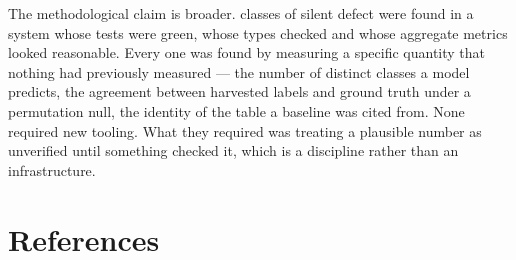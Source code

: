 \documentclass[11pt,a4paper]{article}
\begin{document}
The methodological claim is broader. \ndefectclasses{} classes of silent defect were found in a
system whose
tests were green, whose types checked and whose aggregate metrics looked reasonable. Every one was
found by measuring a specific quantity that nothing had previously measured --- the number of
distinct classes a model predicts, the agreement between harvested labels and ground truth under a
permutation null, the identity of the table a baseline was cited from. None required new tooling.
What they required was treating a plausible number as unverified until something checked it, which
is a discipline rather than an infrastructure.

\section{References}
\end{document}
